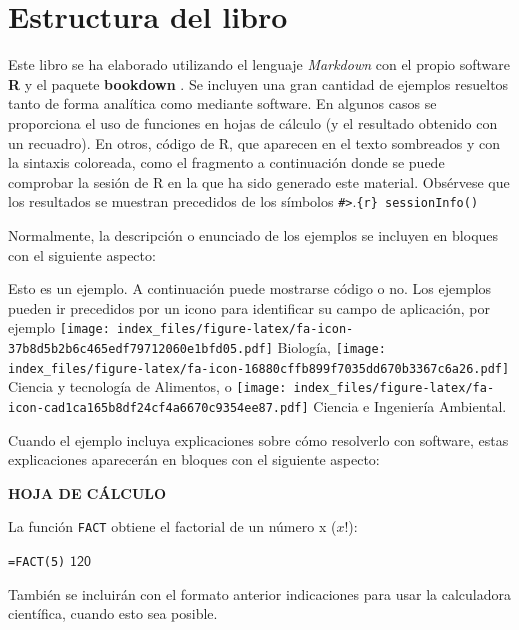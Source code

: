 \documentclass[
]{book}
\begin{document}
\hypertarget{estructura-del-libro}{%
\section*{Estructura del libro}\label{estructura-del-libro}}

Este libro se ha elaborado utilizando el lenguaje \emph{Markdown} con el propio
software \textbf{R} y el paquete \textbf{bookdown} \citep{R-bookdown}.
Se incluyen una gran cantidad de ejemplos resueltos tanto de forma analítica
como mediante software. En algunos casos se proporciona el uso de funciones
en hojas de cálculo (y el resultado obtenido con un recuadro).
En otros, código de R, que aparecen en el texto
sombreados y con la sintaxis coloreada, como el fragmento a continuación
donde se puede comprobar la sesión de R en la que ha sido generado este material.
Obsérvese que los resultados se muestran precedidos de los símbolos
\texttt{\#\textgreater{}}.\texttt{\{r\}\ sessionInfo()}

Normalmente, la descripción o enunciado de los ejemplos se incluyen en bloques
con el siguiente aspecto:

\begin{rmdejemplo}
Esto es un ejemplo. A continuación puede mostrarse código o no. Los ejemplos
pueden ir precedidos por un icono para identificar su campo de aplicación, por
ejemplo \texttt{[image: index\_files/figure-latex/fa-icon-37b8d5b2b6c465edf79712060e1bfd05.pdf]} Biología, \texttt{[image: index\_files/figure-latex/fa-icon-16880cffb899f7035dd670b3367c6a26.pdf]} Ciencia y tecnología de Alimentos, o \texttt{[image: index\_files/figure-latex/fa-icon-cad1ca165b8df24cf4a6670c9354ee87.pdf]} Ciencia e Ingeniería Ambiental.

\end{rmdejemplo}

Cuando el ejemplo incluya explicaciones sobre cómo resolverlo con software,
estas explicaciones aparecerán en bloques con el siguiente aspecto:

\begin{rmdpractica}
\textbf{HOJA DE CÁLCULO}

La función \texttt{FACT} obtiene el factorial de un número x (\(x!\)):

\texttt{=FACT(5)}
\(\boxed{\mathsf{120}}\)

\end{rmdpractica}

También se incluirán con el formato anterior indicaciones para usar la calculadora
científica, cuando esto sea posible.
\end{document}
